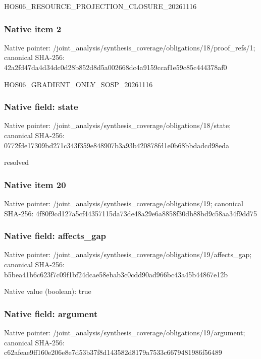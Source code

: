 \documentclass[10pt,a4paper]{article}
\begin{document}
\begingroup\raggedright\sloppy HOS06\_\allowbreak{}RESOURCE\_\allowbreak{}PROJECTION\_\allowbreak{}CLOSURE\_\allowbreak{}20261116\par\endgroup

\subsubsection{Native item 2}
Native pointer: /joint\_\allowbreak{}analysis/synthesis\_\allowbreak{}coverage/obligations/18/proof\_\allowbreak{}refs/1; canonical SHA-256: 42a2fd47da4d34dc0d28b852d8d5a002668dc4a9159ccaf1e59c85c444378af0

\begingroup\raggedright\sloppy HOS06\_\allowbreak{}GRADIENT\_\allowbreak{}ONLY\_\allowbreak{}SOSP\_\allowbreak{}20261116\par\endgroup

\subsubsection{Native field: state}
Native pointer: /joint\_\allowbreak{}analysis/synthesis\_\allowbreak{}coverage/obligations/18/state; canonical SHA-256: 0772fde17309bd271c343f359e848907b3a93b420878fd1e0b68bbdadcd98eda

\begingroup\raggedright\sloppy resolved\par\endgroup

\subsubsection{Native item 20}
Native pointer: /joint\_\allowbreak{}analysis/synthesis\_\allowbreak{}coverage/obligations/19; canonical SHA-256: 4f80f9cd127a5cf44357115da73de48a29e6a8858f30db88bd9c58aa34f9dd75

\subsubsection{Native field: affects\_\allowbreak{}gap}
Native pointer: /joint\_\allowbreak{}analysis/synthesis\_\allowbreak{}coverage/obligations/19/affects\_\allowbreak{}gap; canonical SHA-256: b5bea41b6c623f7c09f1bf24dcae58ebab3c0cdd90ad966bc43a45b44867e12b

Native value (boolean): true

\subsubsection{Native field: argument}
Native pointer: /joint\_\allowbreak{}analysis/synthesis\_\allowbreak{}coverage/obligations/19/argument; canonical SHA-256: c62afeae9ff160e206e8e7d53b37f8d143582d8179a7533c6679481986f56489
\end{document}
